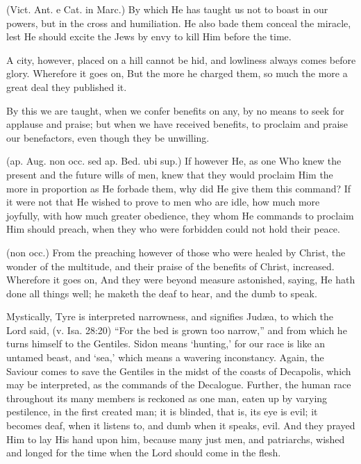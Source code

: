  (Vict. Ant. e Cat. in Marc.) By which He has taught us not to boast in our powers, but in the cross and humiliation. He also bade them conceal the miracle, lest He should excite the Jews by envy to kill Him before the time.

 A city, however, placed on a hill cannot be hid, and lowliness always comes before glory. Wherefore it goes on, But the more he charged them, so much the more a great deal they published it.

 By this we are taught, when we confer benefits on any, by no means to seek for applause and praise; but when we have received benefits, to proclaim and praise our benefactors, even though they be unwilling.

 (ap. Aug. non occ. sed ap. Bed. ubi sup.) If however He, as one Who knew the present and the future wills of men, knew that they would proclaim Him the more in proportion as He forbade them, why did He give them this command? If it were not that He wished to prove to men who are idle, how much more joyfully, with how much greater obedience, they whom He commands to proclaim Him should preach, when they who were forbidden could not hold their peace.

 (non occ.) From the preaching however of those who were healed by Christ, the wonder of the multitude, and their praise of the benefits of Christ, increased. Wherefore it goes on, And they were beyond measure astonished, saying, He hath done all things well; he maketh the deaf to hear, and the dumb to speak.

 Mystically, Tyre is interpreted narrowness, and signifies Judæa, to which the Lord said, (v. Isa. 28:20) “For the bed is grown too narrow,” and from which he turns himself to the Gentiles. Sidon means ‘hunting,’ for our race is like an untamed beast, and ‘sea,’ which means a wavering inconstancy. Again, the Saviour comes to save the Gentiles in the midst of the coasts of Decapolis, which may be interpreted, as the commands of the Decalogue. Further, the human race throughout its many members is reckoned as one man, eaten up by varying pestilence, in the first created man; it is blinded, that is, its eye is evil; it becomes deaf, when it listens to, and dumb when it speaks, evil. And they prayed Him to lay His hand upon him, because many just men, and patriarchs, wished and longed for the time when the Lord should come in the flesh.

